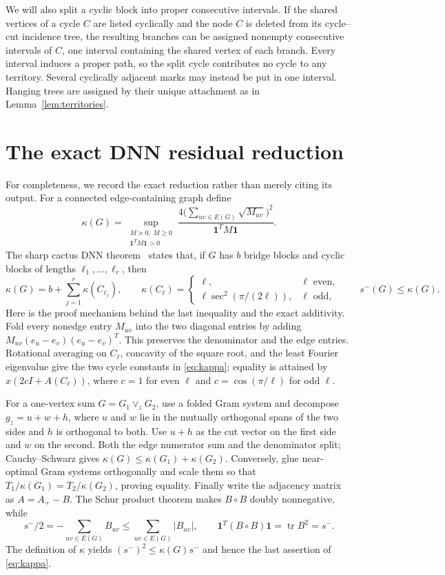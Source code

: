 \documentclass[11pt]{article}
\newcommand{\smE}{s^-}
\newcommand{\one}{\mathbf 1}
\begin{document}
We will also split a cyclic block into proper consecutive intervals.  If the
shared vertices of a cycle $C$ are listed cyclically and the node $C$ is
deleted from its cycle--cut incidence tree, the resulting branches can be
assigned nonempty consecutive intervals of $C$, one interval containing the
shared vertex of each branch.  Every interval induces a proper path, so the
split cycle contributes no cycle to any territory.  Several cyclically
adjacent marks may instead be put in one interval.  Hanging trees are assigned
by their unique attachment as in Lemma~\ref{lem:territories}.

\section{The exact DNN residual reduction}

For completeness, we record the exact reduction rather than merely citing its
output.  For a connected edge-containing graph define
\[
 \kappa(G)=\sup_{\substack{M\succeq0,\ M\geq0\\
                         \one^TM\one>0}}
 \frac{4\bigl(\sum_{uv\in E(G)}\sqrt{M_{uv}}\bigr)^2}
      {\one^TM\one}.
\]
The sharp cactus DNN theorem~\cite{DNN,LTZ} states that, if $G$ has $b$
bridge blocks and cyclic blocks of lengths $\ell_1,\ldots,\ell_r$, then
\begin{equation}\label{eq:kappa}
 \kappa(G)=b+\sum_{j=1}^r\kappa(C_{\ell_j}),\qquad
 \kappa(C_\ell)=
 \begin{cases}
  \ell,&\ell\text{ even},\\
  \ell\sec^2(\pi/(2\ell)),&\ell\text{ odd},
 \end{cases}
 \qquad \smE(G)\leq\kappa(G).
\end{equation}
Here is the proof mechanism behind the last inequality and the exact
additivity.  Fold every nonedge entry $M_{uv}$ into the two diagonal entries
by adding $M_{uv}(e_u-e_v)(e_u-e_v)^T$.  This preserves the denominator and
the edge entries.  Rotational averaging on $C_\ell$, concavity of the square
root, and the least Fourier eigenvalue give the two cycle constants in
\eqref{eq:kappa}; equality is attained by
$x(2cI+A(C_\ell))$, where $c=1$ for even $\ell$ and
$c=\cos(\pi/\ell)$ for odd $\ell$.

For a one-vertex sum $G=G_1\vee_zG_2$, use a folded Gram system and decompose
$g_z=u+w+h$, where $u$ and $w$ lie in the mutually orthogonal spans of the two
sides and $h$ is orthogonal to both.  Use $u+h$ as the cut vector on the first
side and $w$ on the second.  Both the edge numerator sum and the denominator
split; Cauchy--Schwarz gives
$\kappa(G)\leq\kappa(G_1)+\kappa(G_2)$.  Conversely, glue near-optimal Gram
systems orthogonally and scale them so that
$T_1/\kappa(G_1)=T_2/\kappa(G_2)$, proving equality.  Finally write the
adjacency matrix as $A=A_+-B$.  The Schur product theorem makes $B\circ B$
doubly nonnegative, while
\[
 \smE/2=-\sum_{uv\in E(G)}B_{uv}
 \leq\sum_{uv\in E(G)}|B_{uv}|,
 \qquad \one^T(B\circ B)\one=\operatorname{tr}B^2=\smE.
\]
The definition of $\kappa$ yields $(\smE)^2\leq\kappa(G)\smE$ and hence the
last assertion of \eqref{eq:kappa}.
\end{document}
